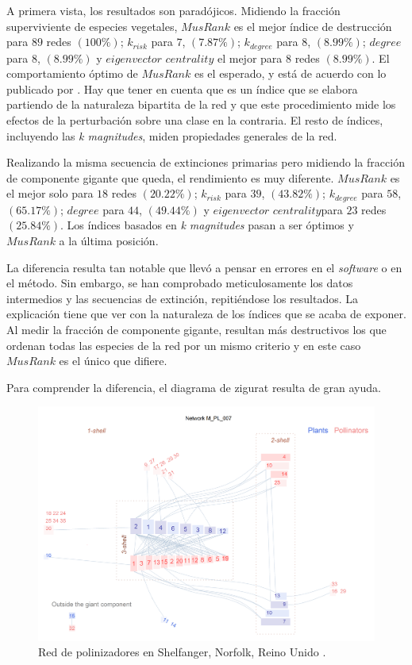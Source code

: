 A primera vista, los resultados son paradójicos. Midiendo la fracción superviviente de especies vegetales, $MusRank$ es el mejor índice de destrucción para $89$ redes $(100\%)$; $k_{risk}$ para $7$, $(7.87\%)$; $k_{degree}$ para $8$, $(8.99\%)$; $degree$ para $8$, $(8.99\%)$ y $eigenvector$ $centrality$ el mejor para $8$ redes $(8.99\%)$. El comportamiento óptimo de $MusRank$ es el esperado, y está de acuerdo con lo publicado por \cite{dominguez2015ranking}. Hay que tener en cuenta que es un índice que se elabora partiendo de la naturaleza bipartita de la red y que este procedimiento mide los efectos de la perturbación sobre una clase en la contraria. El resto de índices, incluyendo las \textit{k magnitudes}, miden propiedades generales de la red.

Realizando la misma secuencia de extinciones primarias pero midiendo la fracción de componente gigante que queda, el rendimiento es muy diferente. $MusRank$ es el mejor solo para $18$ redes $(20.22\%)$; $k_{risk}$ para $39$, $(43.82\%)$; $k_{degree}$ para $58$, $(65.17\%)$; $degree$ para $44$, $(49.44\%)$ y $eigenvector$ $centrality$para $23$ redes $(25.84\%)$. Los índices basados en \textit{k magnitudes} pasan a ser óptimos y $MusRank$ a la última posición.

La diferencia resulta tan notable que llevó a pensar en errores en el \textit{software} o en el método. Sin embargo, se han comprobado meticulosamente los datos intermedios y las secuencias de extinción, repitiéndose los resultados. La explicación tiene que ver con la naturaleza de los índices que se acaba de exponer. Al medir la fracción de componente gigante, resultan más destructivos los que ordenan todas las especies de la red por un mismo criterio y en este caso $MusRank$ es el único que difiere.

Para comprender la diferencia, el diagrama de zigurat resulta de gran ayuda.

\begin{figure}[h!]
\centering
\includegraphics[scale=0.45]{Figures/DEST_M_PL_007_ziggurat.png}
\caption {Red de polinizadores en Shelfanger, Norfolk, Reino Unido \cite{dicks2002compartmentalization}.}
\label{fig:DEST_M_PL_007_ziggurat.png}
\end{figure}

